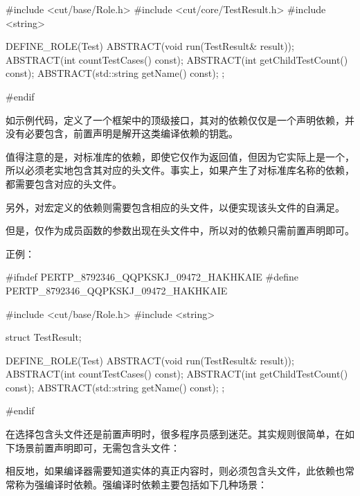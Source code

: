 \begin{content}
\begin{leftbar}
\begin{c++}[caption={\ttfamily{cut/core/Test.h}}]
#include <cut/base/Role.h>
#include <cut/core/TestResult.h>
#include <string>

DEFINE_ROLE(Test)
{
    ABSTRACT(void run(TestResult& result));
    ABSTRACT(int countTestCases() const);
    ABSTRACT(int getChildTestCount() const);
    ABSTRACT(std::string getName() const);
};

#endif
\end{c++}
\end{leftbar}

如示例代码，定义了一个框架中的顶级接口，其对的依赖仅仅是一个声明依赖，并没有必要包含，前置声明是解开这类编译依赖的钥匙。

值得注意的是，对标准库的依赖，即使它仅作为返回值，但因为它实际上是一个，所以必须老实地包含其对应的头文件。事实上，如果产生了对标准库名称的依赖，都需要包含对应的头文件。

另外，对宏定义的依赖则需要包含相应的头文件，以便实现该头文件的自满足。

但是，仅作为成员函数的参数出现在头文件中，所以对的依赖只需前置声明即可。

正例：
\begin{leftbar}
\begin{c++}[caption={\ttfamily{cut/core/Test.h}}]
#ifndef PERTP_8792346_QQPKSKJ_09472_HAKHKAIE
#define PERTP_8792346_QQPKSKJ_09472_HAKHKAIE

#include <cut/base/Role.h>
#include <string>

struct TestResult;

DEFINE_ROLE(Test)
{
    ABSTRACT(void run(TestResult& result));
    ABSTRACT(int countTestCases() const);
    ABSTRACT(int getChildTestCount() const);
    ABSTRACT(std::string getName() const);
};

#endif
\end{c++}
\end{leftbar}

在选择包含头文件还是前置声明时，很多程序员感到迷茫。其实规则很简单，在如下场景前置声明即可，无需包含头文件：

\begin{enum}
\end{enum}

相反地，如果编译器需要知道实体的真正内容时，则必须包含头文件，此依赖也常常称为强编译时依赖。强编译时依赖主要包括如下几种场景：
\begin{enum}
\end{enum}


\end{content}
